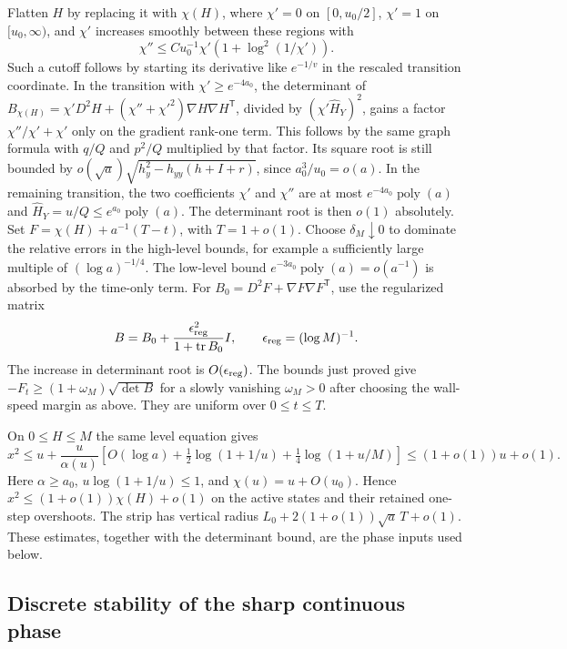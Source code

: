 \documentclass[11pt]{article}
\newcommand{\1}{\mathbf{1}}
\numberwithin{equation}{section}
\begin{document}
Flatten \(H\) by replacing it with \(\chi(H)\), where
\(\chi'=0\) on \([0,u_0/2]\), \(\chi'=1\) on \([u_0,\infty)\),
and \(\chi'\) increases smoothly between these regions with
\[
 \chi''\le C u_0^{-1}\chi'(1+\log^2(1/\chi')).
\]
Such a cutoff follows by starting its derivative like \(e^{-1/v}\)
in the rescaled transition coordinate. In the transition with
\(\chi'\ge e^{-4a_0}\), the determinant of
\(B_{\chi(H)}=\chi' D^2 H+(\chi''+\chi'^2)\nabla H\nabla H^{\mathsf T}\),
divided by \((\chi'\widehat H_Y)^2\), gains a factor
\(\chi''/\chi'+\chi'\) only on the gradient rank-one term.
This follows by the same graph formula with \(q/Q\) and \(p^2/Q\)
multiplied by that factor. Its square root is still bounded by
\(o(\sqrt a)\sqrt{h_y^2-h_{yy}(h+I+r)}\), since
\(a_0^3/u_0=o(a)\).
In the remaining transition, the two coefficients \(\chi'\) and
\(\chi''\) are at most \(e^{-4a_0}\operatorname{poly}(a)\)
and \(\widehat H_Y=u/Q\le e^{a_0}\operatorname{poly}(a)\).
The determinant root is then \(o(1)\) absolutely.
Set \(F=\chi(H)+a^{-1}(T-t)\), with \(T=1+o(1)\).
Choose \(\delta_M\downarrow0\) to dominate the relative
errors in the high-level bounds, for example a sufficiently
large multiple of \((\log a)^{-1/4}\).
The low-level bound \(e^{-3a_0}\operatorname{poly}(a)=o(a^{-1})\)
is absorbed by the time-only term.
For \(B_0=D^2F+\nabla F\nabla F^{\mathsf T}\), use the
regularized matrix
\[
 B=B_0+\frac{\epsilon_{\rm reg}^2}{1+\operatorname{tr}B_0}I,
 \qquad \epsilon_{\rm reg}=(\log M)^{-1}.
\]
The increase in determinant root is \(O(\epsilon_{\rm reg})\).
The bounds just proved give
\(-F_t\ge(1+\omega_M)\sqrt{\det B}\) for a slowly vanishing
\(\omega_M>0\) after choosing the wall-speed margin as above.
They are uniform over \(0\le t\le T\).



On \(0\le H\le M\) the same level equation gives
\[
 x^2\le u+\frac{u}{\alpha(u)}
       \left[O(\log a)+\tfrac12\log(1+1/u)
                                  +\tfrac14\log(1+u/M)\right]
       \le (1+o(1))u+o(1).
\]
Here \(\alpha\ge a_0\), \(u\log(1+1/u)\le1\), and
\(\chi(u)=u+O(u_0)\). Hence \(x^2\le(1+o(1))\chi(H)+o(1)\)
on the active states and their retained one-step overshoots.
The strip has vertical radius
\(L_0+2(1+o(1))\sqrt a\,T+o(1)\). These estimates, together
with the determinant bound, are the phase inputs used below.

\subsection{Discrete stability of the sharp continuous phase}
\label{sec:sharp-discrete-stability}
\end{document}
